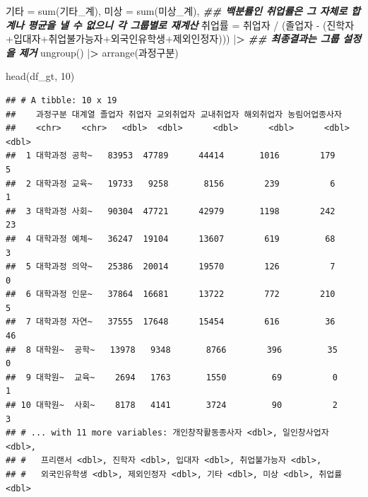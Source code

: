 \documentclass[
]{article}
\newenvironment{Shaded}{\begin{snugshade}}{\end{snugshade}}
\newcommand{\DecValTok}[1]{\textcolor[rgb]{0.00,0.00,0.81}{#1}}
\newcommand{\DocumentationTok}[1]{\textcolor[rgb]{0.56,0.35,0.01}{\textbf{\textit{#1}}}}
\newcommand{\ErrorTok}[1]{\textcolor[rgb]{0.64,0.00,0.00}{\textbf{#1}}}
\newcommand{\FunctionTok}[1]{\textcolor[rgb]{0.00,0.00,0.00}{#1}}
\newcommand{\NormalTok}[1]{#1}
\newcommand{\OtherTok}[1]{\textcolor[rgb]{0.56,0.35,0.01}{#1}}
\newcommand{\SpecialCharTok}[1]{\textcolor[rgb]{0.00,0.00,0.00}{#1}}
\begin{document}
\begin{Shaded}
\begin{Highlighting}[]
\NormalTok{            기타 }\OtherTok{=} \FunctionTok{sum}\NormalTok{(기타\_계), }
\NormalTok{            미상 }\OtherTok{=} \FunctionTok{sum}\NormalTok{(미상\_계), }
    \DocumentationTok{\#\# 백분률인 취업률은 그 자체로 합계나 평균을 낼 수 없으니 각 그룹별로 재계산}
\NormalTok{            취업률 }\OtherTok{=}\NormalTok{ 취업자 }\SpecialCharTok{/}\NormalTok{ (졸업자 }\SpecialCharTok{{-}}\NormalTok{ (진학자}\SpecialCharTok{+}\NormalTok{입대자}\SpecialCharTok{+}\NormalTok{취업불가능자}\SpecialCharTok{+}\NormalTok{외국인유학생}\SpecialCharTok{+}\NormalTok{제외인정자))) }\SpecialCharTok{|}\ErrorTok{\textgreater{}}
  \DocumentationTok{\#\# 최종결과는 그룹 설정을 제거}
  \FunctionTok{ungroup}\NormalTok{()  }\SpecialCharTok{|}\ErrorTok{\textgreater{}} 
  \FunctionTok{arrange}\NormalTok{(과정구분)}

\FunctionTok{head}\NormalTok{(df\_gt, }\DecValTok{10}\NormalTok{)}
\end{Highlighting}
\end{Shaded}

\begin{verbatim}
## # A tibble: 10 x 19
##    과정구분 대계열 졸업자 취업자 교외취업자 교내취업자 해외취업자 농림어업종사자
##    <chr>    <chr>   <dbl>  <dbl>      <dbl>      <dbl>      <dbl>          <dbl>
##  1 대학과정 공학~   83953  47789      44414       1016        179              5
##  2 대학과정 교육~   19733   9258       8156        239          6              1
##  3 대학과정 사회~   90304  47721      42979       1198        242             23
##  4 대학과정 예체~   36247  19104      13607        619         68              3
##  5 대학과정 의약~   25386  20014      19570        126          7              0
##  6 대학과정 인문~   37864  16681      13722        772        210              5
##  7 대학과정 자연~   37555  17648      15454        616         36             46
##  8 대학원~  공학~   13978   9348       8766        396         35              0
##  9 대학원~  교육~    2694   1763       1550         69          0              1
## 10 대학원~  사회~    8178   4141       3724         90          2              3
## # ... with 11 more variables: 개인창작활동종사자 <dbl>, 일인창사업자 <dbl>,
## #   프리랜서 <dbl>, 진학자 <dbl>, 입대자 <dbl>, 취업불가능자 <dbl>,
## #   외국인유학생 <dbl>, 제외인정자 <dbl>, 기타 <dbl>, 미상 <dbl>, 취업률 <dbl>
\end{verbatim}
\end{document}
